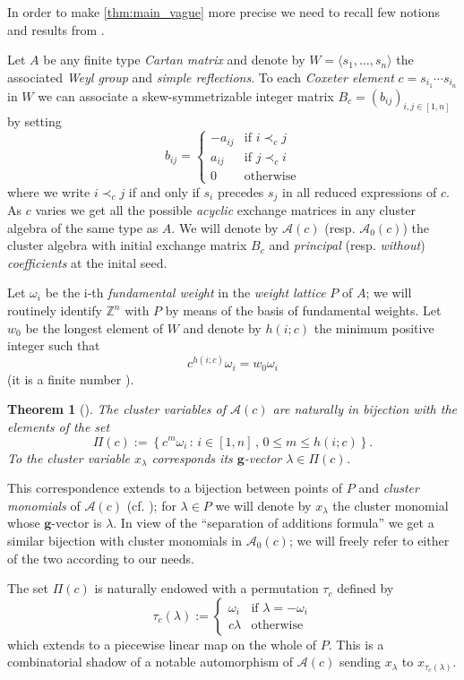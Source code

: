 \documentclass[11pt]{amsart}
\newcommand{\cA}{\mathcal{A}}
\newcommand{\ZZ}{\mathbb{Z}}
\newcommand{\bg}{\mathbf{g}}
\newtheorem{theorem}{Theorem}[section]
\numberwithin{equation}{section}
\begin{document}
  In order to make \cref{thm:main_vague} more precise we need to recall few notions and results from \cite{Ste13,YZ08}.

  Let $A$ be any finite type \emph{Cartan matrix} and denote by $W=\langle s_1,\dots,s_n\rangle$ the associated \emph{Weyl group} and \emph{simple reflections}.
  To each \emph{Coxeter element} $c=s_{i_1}\cdots s_{i_n}$ in $W$ we can associate a skew-symmetrizable integer matrix $B_c=(b_{ij})_{i,j\in[1,n]}$ by setting
  \[
    b_{ij}=
    \begin{cases}
      -a_{ij} & \text{if } i\prec_c j  \\
      a_{ij}  & \text{if } j\prec_c i  \\
      0       & \text{otherwise}
    \end{cases}
  \]
  where we write $i\prec_c j$ if and only if $s_i$ precedes $s_j$ in all reduced expressions of $c$.
  As $c$ varies we get all the possible \emph{acyclic} exchange matrices in any cluster algebra of the same type as $A$.
  We will denote by $\cA(c)$ (resp. $\cA_0(c)$) the cluster algebra with initial exchange matrix $B_c$ and  \emph{principal} (resp. \emph{without}) \emph{coefficients} at the inital seed.

  Let $\omega_i$ be the i-th \emph{fundamental weight} in the \emph{weight lattice} $P$ of $A$; we will routinely identify $\ZZ^n$ with $P$ by means of the basis of fundamental weights.
  Let $w_0$ be the longest element of $W$ and denote by $h(i;c)$ the minimum positive integer such that 
  \[
    c^{h(i;c)}\omega_i = w_0\omega_i
  \]
  (it is a finite number \cite[Proposition 1.3]{YZ08}).
  \begin{theorem}[{\cite[Theorem 1.4]{YZ08}}]
    The cluster variables of $\cA(c)$ are naturally in bijection with the elements of the set
    \[
      \Pi(c)
      :=
      \left\{
        c^m\omega_i \, :\, i\in[1,n] \, , \, 0\leq m \leq h(i;c) 
      \right\}.
    \]
    To the cluster variable $x_\lambda$ corresponds its $\bg$-vector $\lambda\in\Pi(c)$.
  \end{theorem}
  This correspondence extends to a bijection between points of $P$ and \emph{cluster monomials} of $\cA(c)$ (cf. \cite[Theorem 1.2]{Ste13}); for $\lambda\in P$ we will denote by $x_\lambda$ the cluster monomial whose $\bg$-vector is $\lambda$.
  In view of the ``separation of additions formula'' we get a similar bijection with cluster monomials in $\cA_0(c)$; we will freely refer to either of the two according to our needs.

  The set $\Pi(c)$ is naturally endowed with a permutation $\tau_c$ defined by
  \[
    \tau_c (\lambda) 
    :=
    \begin{cases}
      \omega_i  & \text{if $\lambda = -\omega_i$} \\
      c\lambda  & \text{otherwise}
    \end{cases}
  \]
  which extends to a piecewise linear map on the whole of $P$.
  This is a combinatorial shadow of a notable automorphism of $\cA(c)$ sending $x_\lambda$ to $x_{\tau_c(\lambda)}$. 
\end{document}
